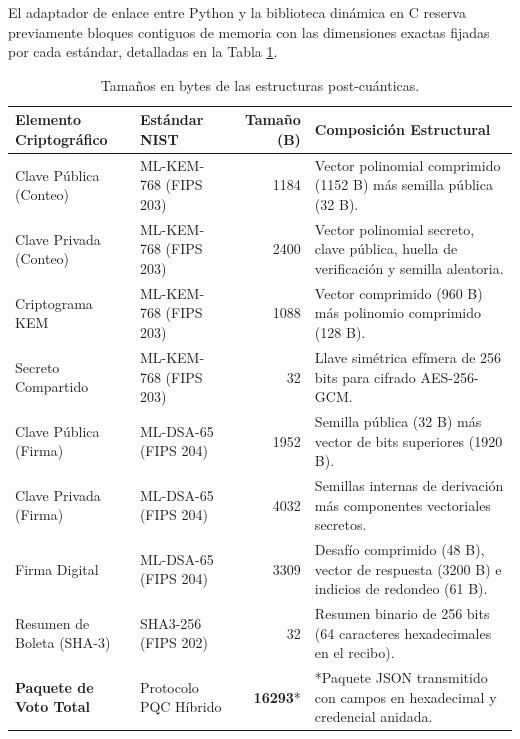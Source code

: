 El adaptador de enlace entre Python y la biblioteca dinámica en C reserva previamente bloques contiguos de memoria con las dimensiones exactas fijadas por cada estándar, detalladas en la Tabla \ref{tab:tamanos_estructuras_didactico}.

\begingroup
\renewcommand{\arraystretch}{1.18}
\setlength{\tabcolsep}{4pt}
\begin{table}[!htbp]
	\centering
	\footnotesize
	\begin{tabular}{|>{\raggedright\arraybackslash}p{2.9cm}|>{\raggedright\arraybackslash}p{2.8cm}|r|>{\raggedright\arraybackslash}p{5.2cm}|}
		\hline
		\textbf{Elemento Criptográfico} & \textbf{Estándar NIST} & \textbf{Tamaño (B)} & \textbf{Composición Estructural} \\
		\hline
		Clave Pública (Conteo) & ML-KEM-768 (FIPS 203) & 1184 & Vector polinomial comprimido (1152 B) más semilla pública (32 B). \\
		\hline
		Clave Privada (Conteo) & ML-KEM-768 (FIPS 203) & 2400 & Vector polinomial secreto, clave pública, huella de verificación y semilla aleatoria. \\
		\hline
		Criptograma KEM & ML-KEM-768 (FIPS 203) & 1088 & Vector comprimido (960 B) más polinomio comprimido (128 B). \\
		\hline
		Secreto Compartido & ML-KEM-768 (FIPS 203) & 32 & Llave simétrica efímera de 256 bits para cifrado AES-256-GCM. \\
		\hline
		Clave Pública (Firma) & ML-DSA-65 (FIPS 204) & 1952 & Semilla pública (32 B) más vector de bits superiores (1920 B). \\
		\hline
		Clave Privada (Firma) & ML-DSA-65 (FIPS 204) & 4032 & Semillas internas de derivación más componentes vectoriales secretos. \\
		\hline
		Firma Digital & ML-DSA-65 (FIPS 204) & 3309 & Desafío comprimido (48 B), vector de respuesta (3200 B) e indicios de redondeo (61 B). \\
		\hline
		Resumen de Boleta (SHA-3) & SHA3-256 (FIPS 202) & 32 & Resumen binario de 256 bits (64 caracteres hexadecimales en el recibo). \\
		\hline
		\textbf{Paquete de Voto Total} & Protocolo PQC Híbrido & \textbf{16293}* & *Paquete JSON transmitido con campos en hexadecimal y credencial anidada. \\
		\hline
	\end{tabular}
	\caption{Tamaños en bytes de las estructuras post-cuánticas.}
	\label{tab:tamanos_estructuras_didactico}
	\par{}
\end{table}
\endgroup


